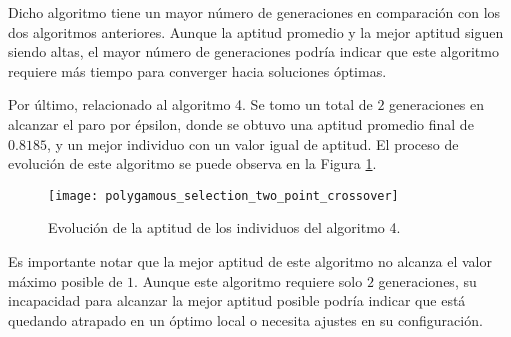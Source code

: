 Dicho algoritmo tiene un mayor número de generaciones en comparación con los dos algoritmos anteriores. Aunque la aptitud promedio y la mejor aptitud siguen siendo altas, el mayor número de generaciones podría indicar que este algoritmo requiere más tiempo para converger hacia soluciones óptimas.

Por último, relacionado al algoritmo 4. Se tomo un total de $2$ generaciones en alcanzar el paro por épsilon, donde se obtuvo una aptitud promedio final de $0.8185$, y un mejor individuo con un valor igual de aptitud. El proceso de evolución de este algoritmo se puede observa en la Figura \ref{fig: p_tp}.

\begin{figure}[htbp]
	\centering
	\texttt{[image: polygamous\_selection\_two\_point\_crossover]}
	\caption{Evolución de la aptitud de los individuos del algoritmo 4.}
	\label{fig: p_tp}
\end{figure}

Es importante notar que la mejor aptitud de este algoritmo no alcanza el valor máximo posible de $1$. Aunque este algoritmo requiere solo $2$ generaciones, su incapacidad para alcanzar la mejor aptitud posible podría indicar que está quedando atrapado en un óptimo local o necesita ajustes en su configuración.